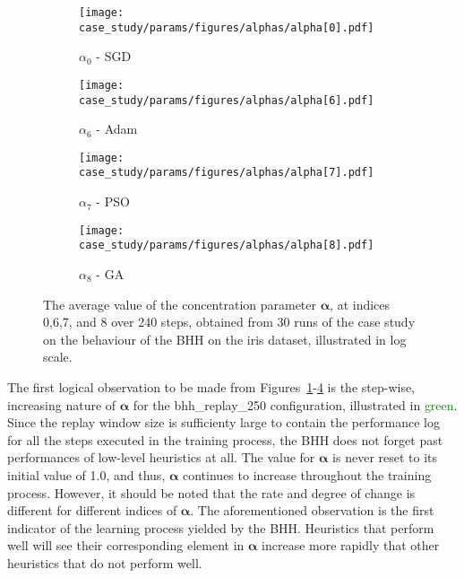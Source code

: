 \begin{figure}[htb]
      \begin{subfigure}{0.5\textwidth}
            \centering
            \texttt{[image: case\_study/params/figures/alphas/alpha[0].pdf]}
            \caption{$\alpha_{0}$ - \acs{SGD}}
            \label{fig:results:case_study:alphas:0}
      \end{subfigure}
      \begin{subfigure}{0.5\textwidth}
            \centering
            \texttt{[image: case\_study/params/figures/alphas/alpha[6].pdf]}
            \caption{$\alpha_{6}$ - \acs{Adam}}
            \label{fig:results:case_study:alphas:6}
      \end{subfigure}
      \par\bigskip
      \begin{subfigure}{0.5\textwidth}
            \centering
            \texttt{[image: case\_study/params/figures/alphas/alpha[7].pdf]}
            \caption{$\alpha_{7}$ - \acs{PSO}}
            \label{fig:results:case_study:alphas:7}
      \end{subfigure}
      \begin{subfigure}{0.5\textwidth}
            \centering
            \texttt{[image: case\_study/params/figures/alphas/alpha[8].pdf]}
            \caption{$\alpha_{8}$ - \acs{GA}}
            \label{fig:results:case_study:alphas:8}
      \end{subfigure}
      \par\bigskip
      \caption{The average value of the concentration parameter $\boldsymbol{\alpha}$, at indices 0,6,7, and 8 over 240 steps, obtained from 30 runs of the case study on the behaviour of the \acs{BHH} on the iris dataset, illustrated in log scale.}
      \label{fig:results:case_study:alphas}
\end{figure}

The first logical observation to be made from Figures~\ref{fig:results:case_study:alphas:0}-\ref{fig:results:case_study:alphas:8} is the step-wise, increasing nature of $\boldsymbol{\alpha}$ for the bhh\_replay\_250 configuration, illustrated in \textcolor{green}{green}. Since the replay window size is sufficienty large to contain the performance log for all the steps executed in the training process, the \acs{BHH} does not forget past performances of low-level heuristics at all. The value for $\boldsymbol{\alpha}$ is never reset to its initial value of 1.0, and thus, $\boldsymbol{\alpha}$ continues to increase throughout the training process. However, it should be noted that the rate and degree of change is different for different indices of $\boldsymbol{\alpha}$. The aforementioned observation is the first indicator of the learning process yielded by the \acs{BHH}. Heuristics that perform well will see their corresponding element in $\boldsymbol{\alpha}$ increase more rapidly that other heuristics that do not perform well.

